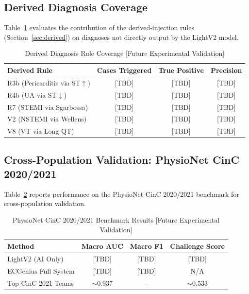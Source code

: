 \documentclass[journal]{IEEEtran}
\begin{document}
\subsection{Derived Diagnosis Coverage}

Table~\ref{tab:derived_eval} evaluates the contribution of the
derived-injection rules (Section~\ref{sec:derived}) on diagnoses
not directly output by the LightV2 model.

\begin{table}[!t]
\centering
\caption{Derived Diagnosis Rule Coverage
         [Future Experimental Validation]}
\label{tab:derived_eval}
\begin{tabular}{@{}lccc@{}}
  \toprule
  Derived Rule & Cases Triggered & True Positive & Precision \\
  \midrule
  R3b (Pericarditis via ST$\uparrow$) & [TBD] & [TBD] & [TBD] \\
  R4b (UA via ST$\downarrow$)         & [TBD] & [TBD] & [TBD] \\
  R7  (STEMI via Sgarbossa)           & [TBD] & [TBD] & [TBD] \\
  V2  (NSTEMI via Wellens)            & [TBD] & [TBD] & [TBD] \\
  V8  (VT via Long QT)                & [TBD] & [TBD] & [TBD] \\
  \bottomrule
\end{tabular}
\end{table}

\subsection{Cross-Population Validation: PhysioNet CinC 2020/2021}

Table~\ref{tab:physionet} reports performance on the PhysioNet
CinC 2020/2021 benchmark for cross-population validation.

\begin{table}[!t]
\centering
\caption{PhysioNet CinC 2020/2021 Benchmark Results
         [Future Experimental Validation]}
\label{tab:physionet}
\begin{tabular}{@{}lccc@{}}
  \toprule
  Method & Macro AUC & Macro F1 & Challenge Score \\
  \midrule
  LightV2 (AI Only)      & [TBD] & [TBD] & [TBD] \\
  ECGenius Full System   & [TBD] & [TBD] & N/A   \\
  Top CinC 2021 Teams    & ${\sim}$0.937 & -- & ${\sim}$0.533 \\
  \bottomrule
\end{tabular}
\end{table}
\end{document}
